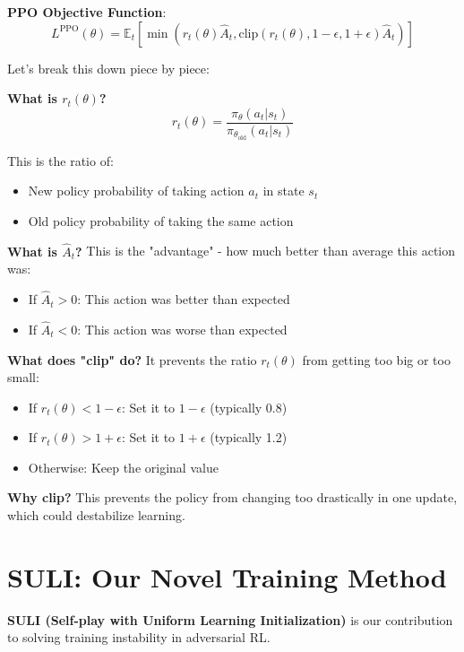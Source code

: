 \documentclass[11pt]{article}
\begin{document}
\begin{mathdetails}
\textbf{PPO Objective Function}:
$$L^{\text{PPO}}(\theta) = \mathbb{E}_t\left[\min(r_t(\theta)\hat{A}_t, \text{clip}(r_t(\theta), 1-\epsilon, 1+\epsilon)\hat{A}_t)\right]$$

Let's break this down piece by piece:

\textbf{What is $r_t(\theta)$?}
$$r_t(\theta) = \frac{\pi_\theta(a_t|s_t)}{\pi_{\theta_{\text{old}}}(a_t|s_t)}$$

This is the ratio of:
\begin{itemize}
\item New policy probability of taking action $a_t$ in state $s_t$
\item Old policy probability of taking the same action
\end{itemize}

\textbf{What is $\hat{A}_t$?} This is the "advantage" - how much better than average this action was:
\begin{itemize}
\item If $\hat{A}_t > 0$: This action was better than expected
\item If $\hat{A}_t < 0$: This action was worse than expected
\end{itemize}

\textbf{What does "clip" do?} It prevents the ratio $r_t(\theta)$ from getting too big or too small:
\begin{itemize}
\item If $r_t(\theta) < 1-\epsilon$: Set it to $1-\epsilon$ (typically 0.8)
\item If $r_t(\theta) > 1+\epsilon$: Set it to $1+\epsilon$ (typically 1.2)
\item Otherwise: Keep the original value
\end{itemize}

\textbf{Why clip?} This prevents the policy from changing too drastically in one update, which could destabilize learning.
\end{mathdetails}

\section{SULI: Our Novel Training Method}

\begin{foundation}
\textbf{SULI (Self-play with Uniform Learning Initialization)} is our contribution to solving training instability in adversarial RL.
\end{foundation}
\end{document}
